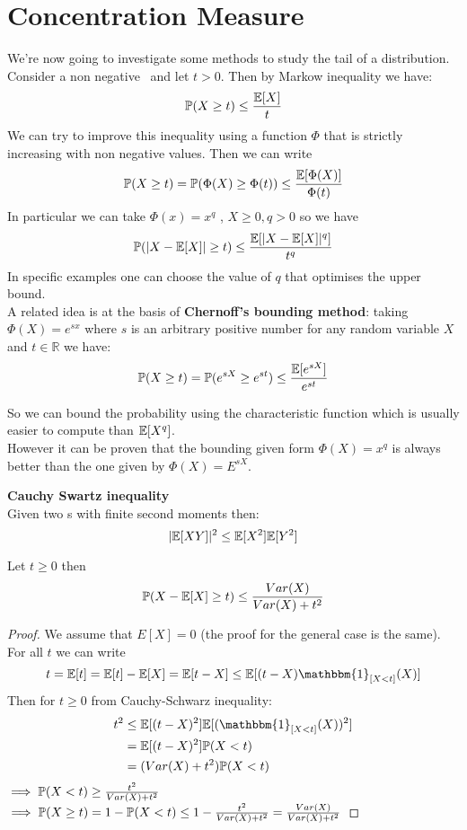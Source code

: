 \chapter{Concentration Measure}
\label{cha:Prop R S}
\vspace{15pt}


We're now going to investigate some methods to study the tail of a distribution.\\
Consider a non negative \rv \  and let $t>0$. Then by Markow inequality we have:
$$\mathbb{P} (X\geq t)\leq \frac{\mathbb{E} [X]}{t}$$
We can try to improve this inequality using a function $\Phi$ that is strictly increasing with non negative values. Then we can write
$$\mathbb{P} (X\geq t)=\mathbb{P} (\Phi(X)\geq \Phi(t) )\leq \frac{ \mathbb{E} [\Phi(X)]}{\Phi(t)}$$
In particular we can take $\Phi(x)=x^q$ , $X\geq 0, q>0$ so we have
$$\mathbb{P} (|X- \mathbb{E} [X]|\geq t)\leq \frac{ \mathbb{E} [|X-\mathbb{E} [X]|^q]}{t^q}$$
In specific examples one can choose the value of $q$ that optimises the upper bound.\\
A related idea is at the basis of \textbf{Chernoff's bounding method}: taking $\Phi(X)=e^{sx}$ where $s$ is an arbitrary positive number for any random variable $X$ and $t\in \mathbb{R}$ we have:
\begin{equation}\label{ineq:Chernoffb}
	\mathbb{P} (X \geq t)= \mathbb{P} (e^{sX}\geq e^{st})\leq \frac{\mathbb{E}[e^{sX}]}{e^{st}}
\end{equation}

So we can bound the probability using the characteristic function which is usually easier to compute than $\mathbb{E} [X^q]$.\\
However it can be proven that the bounding given form $\Phi (X)=x^q$ is always better than the one given by $\Phi(X)=E^{sX}$.\\
\begin{teo}\textbf{Cauchy Swartz inequality}\\
	Given two \rv s with finite second moments then:
	$$|\mathbb{E}[XY]|^2\leq \mathbb{E}[X^2]\mathbb{E}[Y^2]$$
\end{teo}

\begin{teo}
	Let $t\geq 0$ then
	$$\mathbb{P}(X - \mathbb{E}[X]\geq t)\leq \frac{Var(X)}{Var(X)+t^2}$$
\end{teo}
\begin{proof}
	We assume that $E[X]=0$ (the proof for the general case is the same).\\
	For all $t$ we can write 
	$$t=\e[t]=\e[t]-\e[X]=\e[t-X]\leq \e[(t-X)\mathbbm{1}_{[X<t]}(X)]$$
	Then for $t\geq 0$ from Cauchy-Schwarz inequality:
	\[
	\begin{split}
	t^2 
	& \leq \e[(t-X)^2] \e[(\mathbbm{1}_{[X<t]}(X))^2]\\
	&= \e[(t-X)^2] \p(X<t)\\
	&= (Var(X)+t^2)\p(X<t)
	\end{split}	
	\]
	$\implies \mathbb{P}(X<t)\geq \frac{t^2}{Var(X)+t^2}$\\
	$\implies \mathbb{P}(X\geq t)= 1-\mathbb{P}(X<t)\leq 1-\frac{t^2}{Var(X)+t^2}= \frac{Var(X)}{Var(X)+t^2} $
\end{proof}

